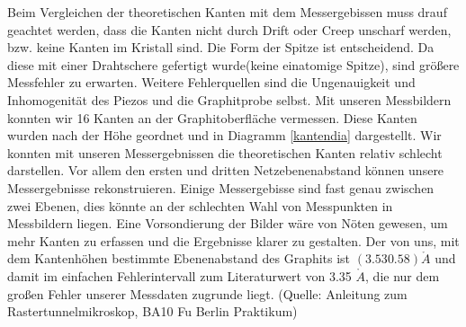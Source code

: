 \documentclass[10pt,a4paper]{article}
\begin{document}
Beim Vergleichen der theoretischen Kanten mit dem Messergebissen muss drauf geachtet werden, dass die Kanten nicht durch Drift oder Creep unscharf werden, bzw. keine Kanten im Kristall sind. Die Form der Spitze ist entscheidend. Da diese mit einer Drahtschere gefertigt wurde(keine einatomige Spitze), sind größere Messfehler zu erwarten. Weitere Fehlerquellen sind die Ungenauigkeit und Inhomogenität des Piezos und die Graphitprobe selbst.
Mit unseren Messbildern konnten wir 16 Kanten an der Graphitoberfläche vermessen. Diese Kanten wurden nach der Höhe geordnet und in Diagramm \ref{kantendia} dargestellt. Wir konnten mit unseren Messergebnissen die theoretischen Kanten relativ schlecht darstellen. Vor allem den ersten und dritten Netzebenenabstand können unsere Messergebnisse rekonstruieren. Einige Messergebisse sind fast genau zwischen zwei Ebenen, dies könnte an der schlechten Wahl von Messpunkten in Messbildern liegen. Eine Vorsondierung der Bilder wäre von Nöten gewesen, um mehr Kanten zu erfassen und die Ergebnisse klarer zu gestalten.
Der von uns, mit dem Kantenhöhen bestimmte Ebenenabstand des Graphits ist $(3.53 0.58)\mathring{A}$ und damit im einfachen Fehlerintervall zum Literaturwert von 3.35 $\mathring{A}$, die nur dem großen Fehler unserer Messdaten zugrunde liegt. (Quelle: Anleitung zum Rastertunnelmikroskop, BA10 Fu Berlin Praktikum)
\end{document}
